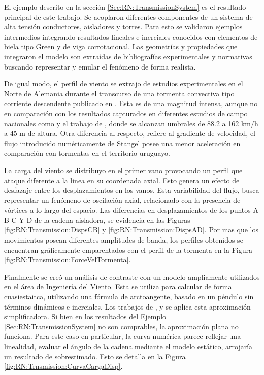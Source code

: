  El ejemplo descrito en la sección \ref{Sec:RN:TransmissionSystem} es el resultado principal de este trabajo. Se acoplaron diferentes componentes de un sistema de alta tensión conductores, aisladores y torres. Para esto se validaron ejemplos intermedios integrando resultados lineales e inerciales conocidos con elementos de biela tipo Green y de viga corrotacional. Las geometrías y propiedades que integraron el modelo son extraídas de bibliografías experimentales y normativas buscando representar y emular el fenómeno de forma realista. 

 De igual modo, el perfil de viento se extrajo de estudios experimentales en el Norte de Alemania durante el transcurso de una tormenta convectiva tipo corriente descendente publicado en \citep{stengel2017measurements}. Esta es de una magnitud intensa, aunque no en comparación con los resultados capturados en diferentes estudios de campo nacionales como \citep{duranona2009analysis} y el trabajo de \cite{duranona2019first}, donde se alcanzan umbrales de 88.2 a 162 km/h a 45 m de altura. Otra diferencia al respecto, refiere al gradiente de velocidad, el flujo introducido numéricamente de Stangel posee una menor aceleración en comparación con tormentas en el territorio uruguayo. 
 
 La carga del viento se distribuyo en el primer vano provocando un perfil que ataque diferente a la linea en su coordenada axial. Esto genera un efecto de desfazaje entre los desplazamientos en los vanos. Esta variabilidad del flujo, busca representar un fenómeno de oscilación axial, relacionado con la presencia de vórtices a lo largo del espacio. Las diferencias en desplazamientos de los puntos A B C Y D de la cadena aisladora, se evidencia en las Figuras \ref{fig:RN:Transmission:DispsCB} y \ref{fig:RN:Transmission:DispsAD}. Por mas que los movimientos posean diferentes amplitudes de banda, los perfiles obtenidos se encuentran gráficamente emparentados con el perfil de la tormenta en la Figura \ref{fig:RN:Transmission:ForceVelTormenta}.  
 
 Finalmente se creó un análisis de contraste con un modelo ampliamente utilizados en el área de Ingeniería del Viento. Esta se utiliza para calcular de forma cuasiestaitca, utilizando una fórmula de arctoangente, basado en un péndulo sin términos dinámicos e inerciales. Los trabajos de \cite{stengel2017measurements}, \cite{duranona2009analysis} y \cite{yan2009numerical} se aplica esta aproximación simplificadora. Si bien en los resultados del Ejemplo \ref{Sec:RN:TransmissionSystem} no son comprables, la aproximación plana no funciona. Para este caso en particular, la curva numérica parece reflejar una linealidad, evaluar el ángulo de la cadena mediante el modelo estático, arrojaría un resultado de sobrestimado. Esto se detalla en la Figura \ref{fig:RN:Trnsmission:CurvaCargaDisp}.

